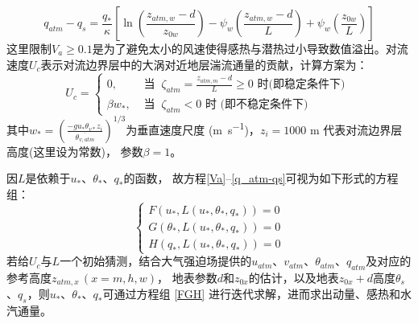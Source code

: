 %
\begin{equation}\label{q_atm-qs}
q_{atm}-q_{s}=\frac{q_{*}}{\kappa}\left[\ln \left(\frac{z_{atm, w}-d}{z_{0 w}}\right)-\psi_{w}\left(\frac{z_{atm, w}-d}{L}\right)+\psi_{w}\left(\frac{z_{0 w}}{L}\right)\right]
\end{equation}
这里限制$V_a\geq0.1$是为了避免太小的风速使得感热与潜热过小导致数值溢出。对流速度$U_c$表示对流边界层中的大涡对近地层湍流通量的贡献，计算方案为：
\begin{equation}
U_{c}= \begin{cases}
 0, & \text { 当 }\ \zeta_{atm}=\frac{z_{atm, m}-d}{L} \geq 0 \text { 时(即稳定条件下) } \\
\beta w_{*}, & \text { 当 }\ \zeta_{atm}<0 \text { 时 (即不稳定条件下) }
\end{cases}
\end{equation}
其中$w_\ast={(\frac{-gu_\ast\theta_{v\ast}z_i}{\overline{\theta_{v,atm}}})}^{1/3}$为垂直速度尺度 (\unit{m.s^{-1}})，$z_i=1000$ m 代表对流边界层高度(这里设为常数)，
参数$\beta=1$。

因$L$是依赖于$u_\ast$、$\theta_\ast$、$q_\ast$的函数，
故方程\eqref{Va}--\eqref{q_atm-qs}可视为如下形式的方程组：
\begin{equation}\label{FGH}
\left\{\begin{array}{l}F\left(u_{*}, L\left(u_{*}, \theta_{*}, q_{*}\right)\right)=0 \\
      G\left(\theta_{*}, L\left(u_{*}, \theta_{*}, q_{*}\right)\right)=0 \\ 
      H\left(q_{*}, L\left(u_{*}, \theta_{*}, q_{*}\right)\right)=0\end{array}\right.
\end{equation}
若给$U_c$与$L$一个初始猜测，结合大气强迫场提供的$u_{atm}$、$v_{atm}$、$\theta_{atm}$、$q_{atm}$及对应的参考高度$z_{atm,x}\, (x=m,h,w)$，
地表参数$d$和$z_{0x}$的估计，以及地表$z_{0x}+d$高度$\theta_s$、$q_s$，则$u_\ast$、$\theta_\ast$、$q_\ast$可通过方程组
\eqref{FGH}
进行迭代求解，进而求出动量、感热和水汽通量。

